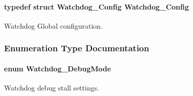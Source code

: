 \paragraph[{Watchdog\-\_\-\-Config}]{\setlength{\rightskip}{0pt plus 5cm}typedef struct {\bf Watchdog\-\_\-\-Config}  {\bf Watchdog\-\_\-\-Config}}\label{_watchdog_8h_ad8c9eb8a1cd2934965d385293fc38647}


Watchdog Global configuration. 



\subsubsection{Enumeration Type Documentation}
\paragraph[{Watchdog\-\_\-\-Debug\-Mode}]{\setlength{\rightskip}{0pt plus 5cm}enum {\bf Watchdog\-\_\-\-Debug\-Mode}}\label{_watchdog_8h_ab1aa5862661c88a16b9d7bc12709d51e}


Watchdog debug stall settings. 

